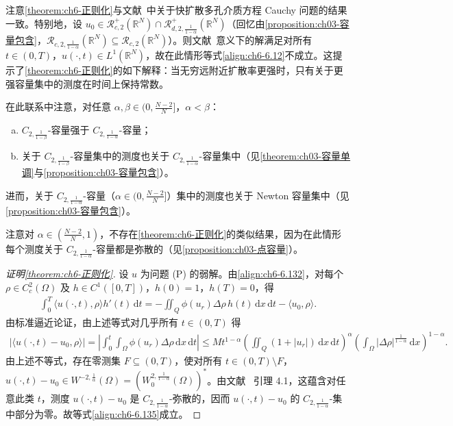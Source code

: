 \documentclass[../../main.tex]{subfiles}%
\begin{document}
\begin{remark}\label{remark:ch06-6.7.2}
注意\cref{theorem:ch6-正则化}与文献~\cite{ref26,ref80}中关于快扩散多孔介质方程 Cauchy 问题的结果一致。特别地，设 $u_0\in\mathscr{R}^+_{c,2}(\mathbb{R}^N)\cap\mathscr{R}^+_{d,2,\frac{1}{1-\alpha}}(\mathbb{R}^N)$（回忆由\cref{proposition:ch03-容量包含}，$\mathscr{R}_{c,2,\frac{1}{1-\alpha}}(\mathbb{R}^N)\subseteq\mathscr{R}_{c,2}(\mathbb{R}^N)$）。则文献~\cite{ref26,ref80}意义下的解满足对所有 $t\in(0,T)$，$u(\cdot,t)\in L^1(\mathbb{R}^N)$，故在此情形等式\eqref{align:ch6-6.12}不成立。这提示了\cref{theorem:ch6-正则化}的如下解释：当无穷远附近扩散率更强时，只有关于更强容量集中的测度在时间上保持常数。

在此联系中注意，对任意 $\alpha,\beta\in(0,\frac{N-2}{N}]$，$\alpha<\beta$：
\begin{enumerate}[(a)]
\item $C_{2,\frac{1}{1-\beta}}$-容量强于 $C_{2,\frac{1}{1-\alpha}}$-容量；
\item 关于 $C_{2,\frac{1}{1-\beta}}$-容量集中的测度也关于 $C_{2,\frac{1}{1-\alpha}}$-容量集中（见\cref{theorem:ch03-容量单调}与\cref{proposition:ch03-容量包含}）。
\end{enumerate}
进而，关于 $C_{2,\frac{1}{1-\alpha}}$-容量（$\alpha\in(0,\frac{N-2}{N}]$）集中的测度也关于 Newton 容量集中（见\cref{proposition:ch03-容量包含}）。

注意对 $\alpha\in(\frac{N-2}{N},1)$，不存在\cref{theorem:ch6-正则化}的类似结果，因为在此情形每个测度关于 $C_{2,\frac{1}{1-\alpha}}$-容量都是弥散的（见\cref{proposition:ch03-点容量}）。
\end{remark}

\begin{proof}[证明\cref{theorem:ch6-正则化}]
设 $u$ 为问题 (P) 的弱解。由\eqref{align:ch6-6.132}，对每个 $\rho\in C^2_c(\Omega)$ 及 $h\in C^1([0,T])$，$h(0)=1$，$h(T)=0$，得
\begin{align*}
\int_0^T\langle u(\cdot,t),\rho\rangle h'(t)\,\mathrm{d}t
=-\iint_Q\phi(u_r)\Delta\rho\,h(t)\,\mathrm{d}x\,\mathrm{d}t-\langle u_0,\rho\rangle.
\end{align*}
由标准逼近论证，由上述等式对几乎所有 $t\in(0,T)$ 得
\begin{align}
|\langle u(\cdot,t)-u_0,\rho\rangle|
=\left|\int_0^t\int_\Omega\phi(u_r)\Delta\rho\,\mathrm{d}x\,\mathrm{d}t\right|
\leqslant Mt^{1-\alpha}\left(\iint_Q(1+|u_r|)\,\mathrm{d}x\,\mathrm{d}t\right)^\alpha
\left(\int_\Omega|\Delta\rho|^{\frac{1}{1-\alpha}}\,\mathrm{d}x\right)^{1-\alpha}. \label{align:ch6-6.136}
\end{align}
由上述不等式，存在零测集 $F\subseteq(0,T)$，使对所有 $t\in(0,T)\setminus F$，$u(\cdot,t)-u_0\in W^{-2,\frac{1}{\alpha}}(\Omega)=(W^{2,\frac{1}{1-\alpha}}_0(\Omega))^*$。由文献~\cite{ref10} 引理 4.1，这蕴含对任意此类 $t$，测度 $u(\cdot,t)-u_0$ 是 $C_{2,\frac{1}{1-\alpha}}$-弥散的，因而 $u(\cdot,t)-u_0$ 的 $C_{2,\frac{1}{1-\alpha}}$-集中部分为零。故等式\eqref{align:ch6-6.135}成立。
\end{proof}
\end{document}
